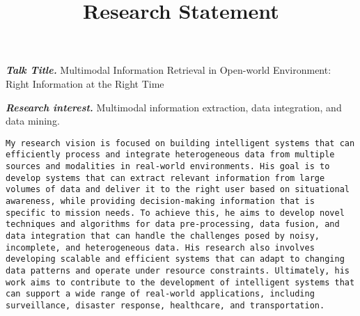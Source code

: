 \documentclass[9pt]{article}
\title{
    \vspace{-3em}
    \textbf{Research Statement} \hfill \href{https://ksolaiman.github.io/}{\textit{\Name}}
    \vspace{-2.5em}
}
\date{}
\makeatletter
\def \section {%
    \@startsection {section}
    {1}%
    {\z@}%
    {-3.3ex \@plus -1ex \@minus -.2ex}%
    {0.2em}
    {\normalfont \Large \scshape \bfseries} %
    }
\newcommand*\heading[1]{\large\textbf{\textit{#1.}}}
\makeatother
\begin{document}
\maketitle
\pagestyle{plain}

\heading{Talk Title} Multimodal Information Retrieval in Open-world Environment: Right Information at the Right Time

\heading{Research interest} Multimodal information extraction, data integration, and data mining.




\texttt{My research vision is focused on building intelligent systems that can efficiently process and integrate heterogeneous data from multiple sources and modalities in real-world environments. His goal is to develop systems that can extract relevant information from large volumes of data and deliver it to the right user based on situational awareness, while providing decision-making information that is specific to mission needs. To achieve this, he aims to develop novel techniques and algorithms for data pre-processing, data fusion, and data integration that can handle the challenges posed by noisy, incomplete, and heterogeneous data. His research also involves developing scalable and efficient systems that can adapt to changing data patterns and operate under resource constraints. Ultimately, his work aims to contribute to the development of intelligent systems that can support a wide range of real-world applications, including surveillance, disaster response, healthcare, and transportation.}
\end{document}
